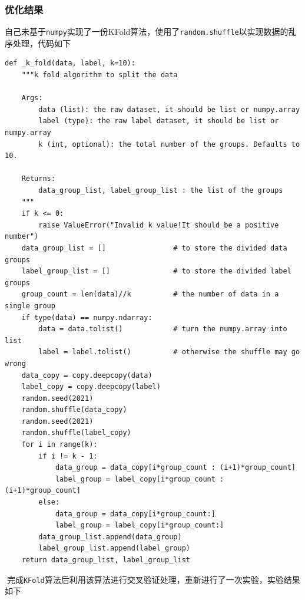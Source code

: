 \documentclass[utf-8]{article}
\begin{document}
\subsubsection{优化结果}
自己未基于\verb|numpy|实现了一份KFold算法，使用了\verb|random.shuffle|以实现数据的乱序处理，代码如下
\begin{lstlisting}[style = python]
def _k_fold(data, label, k=10):
    """k fold algorithm to split the data

    Args:
		data (list): the raw dataset, it should be list or numpy.array
		label (type): the raw label dataset, it should be list or numpy.array
        k (int, optional): the total number of the groups. Defaults to 10.

    Returns:
        data_group_list, label_group_list : the list of the groups
    """
	if k <= 0:
		raise ValueError("Invalid k value!It should be a positive number")
    data_group_list = []                # to store the divided data groups
    label_group_list = []               # to store the divided label groups
    group_count = len(data)//k          # the number of data in a single group
    if type(data) == numpy.ndarray:
        data = data.tolist()            # turn the numpy.array into list
        label = label.tolist()          # otherwise the shuffle may go wrong
    data_copy = copy.deepcopy(data)
    label_copy = copy.deepcopy(label)
    random.seed(2021)
    random.shuffle(data_copy)
    random.seed(2021)
    random.shuffle(label_copy)
    for i in range(k):
        if i != k - 1:
            data_group = data_copy[i*group_count : (i+1)*group_count]
            label_group = label_copy[i*group_count : (i+1)*group_count]
        else:
            data_group = data_copy[i*group_count:]
            label_group = label_copy[i*group_count:]
        data_group_list.append(data_group)
        label_group_list.append(label_group)
    return data_group_list, label_group_list
\end{lstlisting}


完成\verb|KFold|算法后利用该算法进行交叉验证处理，重新进行了一次实验，实验结果如下
\end{document}

